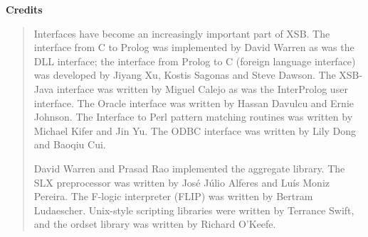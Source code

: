 
\begin{center}
{\bf {\Large 
		Credits
}}
\end{center}


\begin{quote}
Interfaces have become an increasingly important part of XSB.  The
interface from C to Prolog was implemented by David Warren as was the
DLL interface; the interface from Prolog to C (foreign language
interface) was developed by Jiyang Xu, Kostis Sagonas and Steve
Dawson.  The XSB-Java interface was written by Miguel Calejo as was
the InterProlog user interface.  The Oracle interface was written by
Hassan Davulcu and Ernie Johnson.  The Interface to Perl pattern
matching routines was written by Michael Kifer and Jin Yu.  The ODBC
interface was written by Lily Dong and Baoqiu Cui.

David Warren and Prasad Rao implemented the aggregate library.  The
SLX preprocessor was written by Jos\'e J\'ulio Alferes and Lu\'is
Moniz Pereira.  The F-logic interpreter (FLIP) was written by Bertram
Ludaescher.  Unix-style scripting libraries were written by
Terrance Swift, and the ordset library was written by Richard O'Keefe.

\end{quote}
